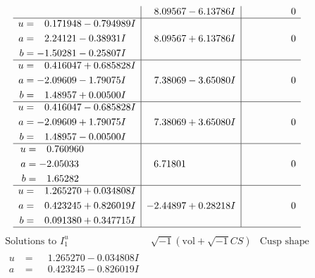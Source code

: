 \documentclass[1p]{elsarticle_modified}
\theoremstyle{definition}
\newcommand{\I}{\sqrt{-1}}
\begin{document}
$$\begin{array}{c|c|c}
 & \phantom{-}8.09567 - 6.13786 I & \phantom{-0.000000 } 0 \\ \hline\begin{aligned}
u &= \phantom{-}0.171948 - 0.794989 I \\
a &= \phantom{-}2.24121 - 0.38931 I \\
b &= -1.50281 - 0.25807 I\end{aligned}
 & \phantom{-}8.09567 + 6.13786 I & \phantom{-0.000000 } 0 \\ \hline\begin{aligned}
u &= \phantom{-}0.416047 + 0.685828 I \\
a &= -2.09609 - 1.79075 I \\
b &= \phantom{-}1.48957 + 0.00500 I\end{aligned}
 & \phantom{-}7.38069 - 3.65080 I & \phantom{-0.000000 } 0 \\ \hline\begin{aligned}
u &= \phantom{-}0.416047 - 0.685828 I \\
a &= -2.09609 + 1.79075 I \\
b &= \phantom{-}1.48957 - 0.00500 I\end{aligned}
 & \phantom{-}7.38069 + 3.65080 I & \phantom{-0.000000 } 0 \\ \hline\begin{aligned}
u &= \phantom{-}0.760960\phantom{ +0.000000I} \\
a &= -2.05033\phantom{ +0.000000I} \\
b &= \phantom{-}1.65282\phantom{ +0.000000I}\end{aligned}
 & \phantom{-}6.71801\phantom{ +0.000000I} & \phantom{-0.000000 } 0 \\ \hline\begin{aligned}
u &= \phantom{-}1.265270 + 0.034808 I \\
a &= \phantom{-}0.423245 + 0.826019 I \\
b &= \phantom{-}0.091380 + 0.347715 I\end{aligned}
 & -2.44897 + 0.28218 I & \phantom{-0.000000 } 0\\
 \hline 
 \end{array}$$\newpage$$\begin{array}{c|c|c}  
\text{Solutions to }I^u_{1}& \I (\text{vol} + \sqrt{-1}CS) & \text{Cusp shape}\\
 \hline 
\begin{aligned}
u &= \phantom{-}1.265270 - 0.034808 I \\
a &= \phantom{-}0.423245 - 0.826019 I \\

\end{aligned}
\end{array}$$
\end{document}
